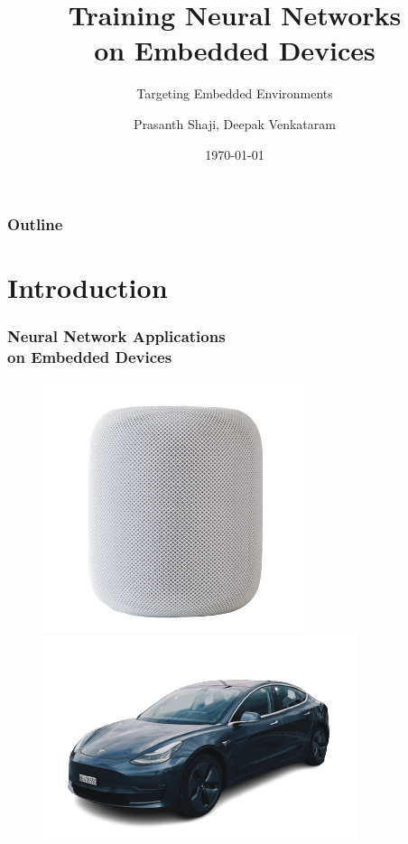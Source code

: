 \documentclass{beamer}
\title
{Training Neural Networks \\ on Embedded Devices}
\subtitle{Targeting Embedded Environments}
\author[Prasanth Shaji, Deepak Venkataram]
{Prasanth Shaji, Deepak Venkataram}
\institute[Dept. of Information Technology]
{
  Master's Thesis \\
  Uppsala University
}
\date[HDR-NN]
{\today}
\begin{document}
\begin{frame}[plain]
  \titlepage
\end{frame}

\begin{frame}
    \frametitle{Outline}
    \tableofcontents
\end{frame}

\section{Introduction}

\begin{frame}
  \frametitle{Neural Network Applications \\ on Embedded Devices}

  \begin{figure}
    \centering
    \includegraphics[scale=0.42]{images/smart-speaker}
    \includegraphics[scale=0.42]{images/tesla}
  \end{figure}

\end{frame}
\end{document}
